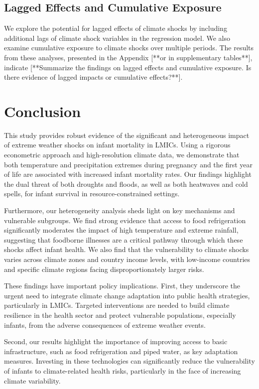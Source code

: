 \documentclass[12pt]{article}
\begin{document}
\subsection{Lagged Effects and Cumulative Exposure}

We explore the potential for lagged effects of climate shocks by including additional lags of climate shock variables in the regression model.  We also examine cumulative exposure to climate shocks over multiple periods.  The results from these analyses, presented in the Appendix [**or in supplementary tables**], indicate [**Summarize the findings on lagged effects and cumulative exposure. Is there evidence of lagged impacts or cumulative effects?**].

\section{Conclusion} \label{sec:conclusion}

This study provides robust evidence of the significant and heterogeneous impact of extreme weather shocks on infant mortality in LMICs.  Using a rigorous econometric approach and high-resolution climate data, we demonstrate that both temperature and precipitation extremes during pregnancy and the first year of life are associated with increased infant mortality rates.  Our findings highlight the dual threat of both droughts and floods, as well as both heatwaves and cold spells, for infant survival in resource-constrained settings.

Furthermore, our heterogeneity analysis sheds light on key mechanisms and vulnerable subgroups.  We find strong evidence that access to food refrigeration significantly moderates the impact of high temperature and extreme rainfall, suggesting that foodborne illnesses are a critical pathway through which these shocks affect infant health.  We also find that the vulnerability to climate shocks varies across climate zones and country income levels, with low-income countries and specific climate regions facing disproportionately larger risks.

These findings have important policy implications.  First, they underscore the urgent need to integrate climate change adaptation into public health strategies, particularly in LMICs.  Targeted interventions are needed to build climate resilience in the health sector and protect vulnerable populations, especially infants, from the adverse consequences of extreme weather events.

Second, our results highlight the importance of improving access to basic infrastructure, such as food refrigeration and piped water, as key adaptation measures.  Investing in these technologies can significantly reduce the vulnerability of infants to climate-related health risks, particularly in the face of increasing climate variability.
\end{document}
